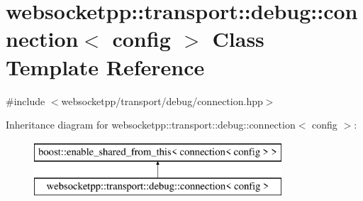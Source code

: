 \hypertarget{classwebsocketpp_1_1transport_1_1debug_1_1connection}{}\section{websocketpp\+:\+:transport\+:\+:debug\+:\+:connection$<$ config $>$ Class Template Reference}
\label{classwebsocketpp_1_1transport_1_1debug_1_1connection}


{\ttfamily \#include $<$websocketpp/transport/debug/connection.\+hpp$>$}

Inheritance diagram for websocketpp\+:\+:transport\+:\+:debug\+:\+:connection$<$ config $>$\+:\begin{figure}[H]
\begin{center}
\leavevmode
\includegraphics[height=2.000000cm]{classwebsocketpp_1_1transport_1_1debug_1_1connection}
\end{center}
\end{figure}
